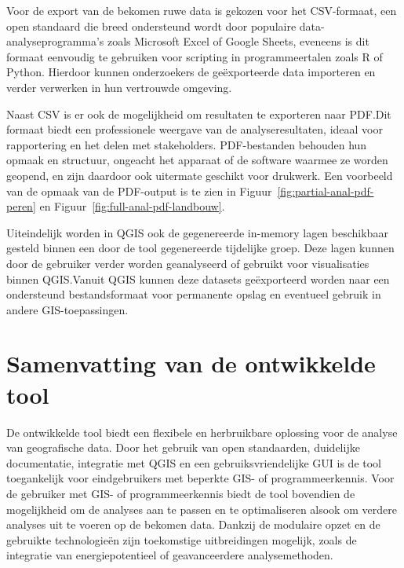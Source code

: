 Voor de export van de bekomen ruwe data is gekozen voor het CSV-formaat, een open standaard die breed ondersteund wordt door populaire data-analyseprogramma's zoals Microsoft Excel of Google Sheets, eveneens is dit formaat eenvoudig te gebruiken voor scripting in programmeertalen zoals R of Python. Hierdoor kunnen onderzoekers de geëxporteerde data importeren en verder verwerken in hun vertrouwde omgeving. \medskip

Naast CSV is er ook de mogelijkheid om resultaten te exporteren naar PDF.\@ Dit formaat biedt een professionele weergave van de analyse\-resultaten, ideaal voor rapportering en het delen met stakeholders. PDF-bestanden behouden hun opmaak en structuur, ongeacht het apparaat of de software waarmee ze worden geopend, en zijn daardoor ook uitermate geschikt voor drukwerk. Een voorbeeld van de opmaak van de PDF-output is te zien in Figuur~\ref{fig:partial-anal-pdf-peren} en Figuur~\ref{fig:full-anal-pdf-landbouw}.\medskip


Uiteindelijk worden in QGIS ook de gegenereerde in-memory lagen beschikbaar gesteld binnen een door de tool gegenereerde tijdelijke groep. Deze lagen kunnen door de gebruiker verder worden geanalyseerd of gebruikt voor visualisaties binnen QGIS.\@ Vanuit QGIS kunnen deze datasets geëxporteerd worden naar een ondersteund bestandsformaat voor permanente opslag en eventueel gebruik in andere GIS-toepassingen.


\section{Samenvatting van de ontwikkelde tool}

De ontwikkelde tool biedt een flexibele en herbruikbare oplossing voor de analyse van geografische data. Door het gebruik van open standaarden, duidelijke documentatie, integratie met QGIS en een gebruiksvriendelijke GUI is de tool toegankelijk voor eindgebruikers met beperkte GIS- of programmeerkennis. Voor de gebruiker met GIS- of programmeerkennis biedt de tool bovendien de mogelijkheid om de analyses aan te passen en te optimaliseren alsook om verdere analyses uit te voeren op de bekomen data. Dankzij de modulaire opzet en de gebruikte technologieën zijn toekomstige uitbreidingen mogelijk, zoals de integratie van energiepotentieel of geavanceerdere analysemethoden.